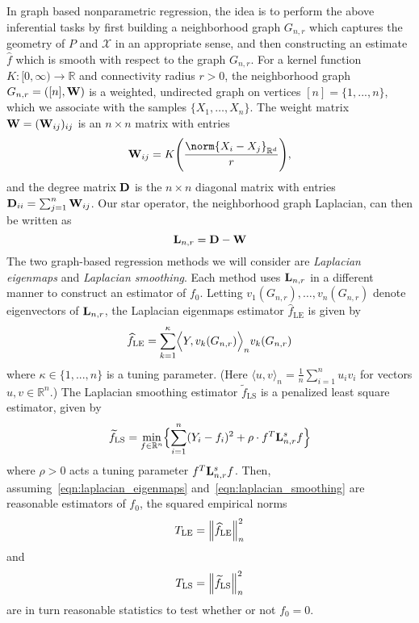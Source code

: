 \documentclass{article}
\newcommand{\Reals}{\mathbb{R}}
\newcommand{\1}{\mathbf{1}}
\newcommand{\Rd}{\Reals^d}
\newcommand{\Lap}{{\bf L}}
\newcommand{\mc}[1]{\mathcal{#1}}
\newcommand{\dotp}[2]{\langle #1, #2 \rangle}
\newcommand{\Dotp}[2]{\Bigl\langle #1, #2 \Bigr\rangle}
\newcommand{\wt}[1]{\widetilde{#1}}
\newcommand{\wh}[1]{\widehat{#1}}
\newcommand{\LE}{\mathrm{LE}}
\newcommand{\LS}{\mathrm{LS}}
\theoremstyle{alden}
\theoremstyle{aldenthm}
\theoremstyle{definition}
\theoremstyle{remark}
\begin{document}
In graph based nonparametric regression, the idea is to perform the above inferential tasks by first building a neighborhood graph $G_{n,r}$ which captures the geometry of $P$ and $\mc{X}$ in an appropriate sense, and then constructing an estimate $\wh{f}$ which is smooth with respect to the graph $G_{n,r}$. For a kernel function $K: [0,\infty) \to \Reals$ and connectivity radius $r > 0$, the neighborhood graph $G_{n,r} = ([n],{\bf W})$ is a weighted, undirected graph on vertices $[n] = \{1,...,n\}$, which we associate with the samples $\{X_1,\ldots,X_n\}$. The weight matrix ${\bf W} = ({\bf W}_{ij})_{ij}$ is an $n \times n$ matrix with entries
\begin{equation*}
\label{eqn:neighborhood_graph}
{\bf W}_{ij} = K\Biggl(\frac{\norm{X_i - X_j}_{\Rd}}{r}\Biggr),
\end{equation*}
and the degree matrix ${\bf D}$ is the $n \times n$ diagonal matrix with entries ${\bf D}_{ii} = \sum_{j = 1}^{n}{\bf W}_{ij}$.  Our star operator, the neighborhood graph Laplacian, can then be written as
\begin{equation}
\label{eqn:graph_Laplacian}
\Lap_{n,r} = \bf{D} - \bf{W}
\end{equation}
The two graph-based regression methods we will consider are \emph{Laplacian eigenmaps} and \emph{Laplacian smoothing}. Each method uses $\Lap_{n,r}$ in a different manner to construct an estimator of $f_0$. Letting $v_1(G_{n,r}),\ldots,v_n(G_{n,r})$ denote eigenvectors of $\Lap_{n,r}$, the Laplacian eigenmaps estimator $\wh{f}_{\LE}$ \citep{belkin2003} is given by 
\begin{equation}
\label{eqn:laplacian_eigenmaps}
\wh{f}_{\textrm{LE}} = \sum_{k = 1}^{\kappa} \Dotp{Y}{v_k(G_{n,r})}_n v_{k}(G_{n,r})
\end{equation}
where $\kappa \in \{1,...,n\}$ is a tuning parameter. (Here $\dotp{u}{v}_n = \frac{1}{n}\sum_{i = 1}^{n} u_i v_i$ for vectors $u,v \in \Reals^n$.) The Laplacian smoothing estimator $\wt{f}_{\LS}$ \citep{smola2003} is a penalized least square estimator, given by
\begin{equation}
\label{eqn:laplacian_smoothing}
\wt{f}_{\LS}= \min_{f \in \Reals^n} \Bigl\{\sum_{i = 1}^{n}(Y_i - f_i)^2 + \rho \cdot f^T \Lap_{n,r}^s f \Bigr\}
\end{equation}
where $\rho > 0$ acts a tuning parameter $f^T \Lap_{{n,r}}^s f$. Then, assuming~\eqref{eqn:laplacian_eigenmaps} and~\eqref{eqn:laplacian_smoothing} are reasonable estimators of $f_0$, the squared empirical norms
\begin{equation}
T_{\LE} = \Bigl\|\wh{f}_{\LE}\Bigr\|_n^2 \label{eqn:laplacian_eigenmaps_test}
\end{equation}
and
\begin{equation}
T_{\LS} = \Bigl\|\wt{f}_{\LS}\Bigr\|_n^2 \label{eqn:laplacian_smoothing_test}
\end{equation}
are in turn reasonable statistics to test whether or not $f_0 = 0$.
\end{document}
